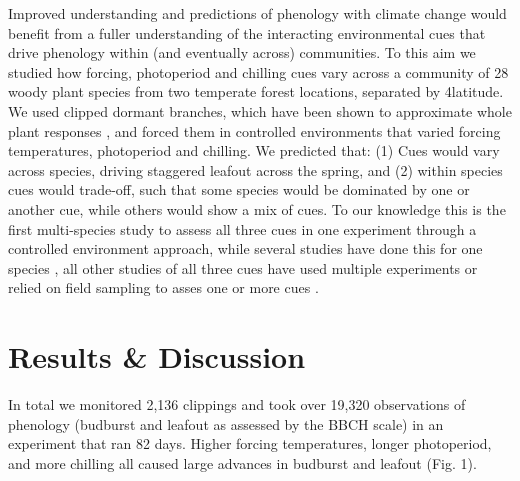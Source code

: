 \documentclass[11pt]{article}
\begin{document}
Improved understanding and predictions of phenology with climate change would benefit from a fuller understanding of the interacting environmental cues that drive phenology within (and eventually across) communities. To this aim we studied how forcing, photoperiod and chilling cues vary across a community of 28 woody plant species from two temperate forest locations, separated by 4\degree latitude. We used clipped dormant branches, which have been shown to approximate whole plant responses \cite{vitasseclippings}, and forced them in controlled environments that varied forcing temperatures, photoperiod and chilling. We predicted that: (1) Cues would vary across species, driving staggered leafout across the spring, and (2) within species cues would trade-off, such that some species would be dominated by one or another cue, while others would show a mix of cues. To our knowledge this is the first multi-species study to assess all three cues in one experiment through a controlled environment approach, while several studies have done this for one species \cite{Worrall:1967aa,Skuterud:1994aa,Sogaard:2008aa,Sonsteby:2014aa}, all other studies of all three cues have used multiple experiments \cite[e.g.,][]{Caffarra:2011ab} or relied on field sampling to asses one or more cues \cite[e.g,][]{Basler:2012aa,laube2014gcb,zohner2016ncc}. 

\section*{Results \& Discussion}
In total we monitored 2,136 clippings and took over 19,320 observations of phenology (budburst and leafout as assessed by the BBCH scale) in an experiment that ran 82 days. Higher forcing temperatures, longer photoperiod, and more chilling all caused large advances in budburst and leafout (Fig. 1).\\
\end{document}
